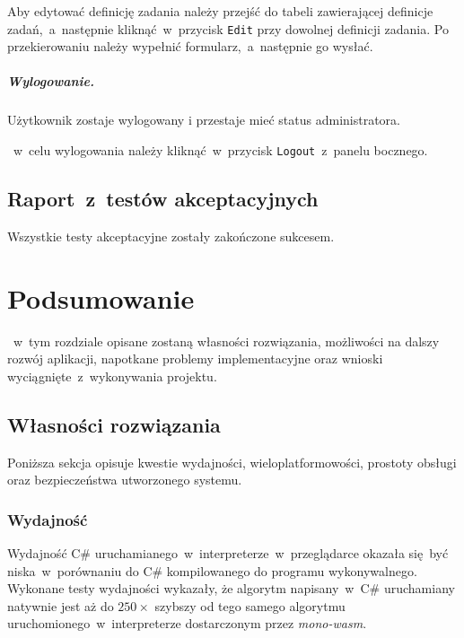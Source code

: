 \documentclass[a4paper,11pt,twoside]{report}
\theoremstyle{definition}
\begin{document}
                Aby edytować definicję zadania należy przejść do tabeli zawierającej definicje zadań,~a~następnie kliknąć~w~przycisk \texttt{Edit} przy dowolnej definicji zadania. Po przekierowaniu należy wypełnić formularz,~a~następnie go wysłać.

            \paragraph{Wylogowanie.}
                \noindent Użytkownik zostaje wylogowany i przestaje mieć status administratora.

               ~w~celu wylogowania należy kliknąć~w~przycisk \texttt{Logout}~z~panelu bocznego.


            \subsubsection{}    
            
    \section{Raport~z~testów akceptacyjnych}
    
        Wszystkie testy akceptacyjne zostały zakończone sukcesem.

\chapter{Podsumowanie}

   ~w~tym rozdziale opisane zostaną własności rozwiązania, możliwości na dalszy rozwój aplikacji,
    napotkane problemy implementacyjne oraz wnioski wyciągnięte~z~wykonywania projektu.

    \section{Własności rozwiązania}
        \label{wlasnosci-rozwiazania}
        Poniższa sekcja opisuje kwestie wydajności, wieloplatformowości, prostoty obsługi oraz bezpieczeństwa utworzonego systemu.
        
        \subsection{Wydajność}
            Wydajność C\# uruchamianego~w~interpreterze~w~przeglądarce okazała się być niska~w~porównaniu do C\# kompilowanego do programu wykonywalnego.
            Wykonane testy wydajności wykazały, że algorytm napisany~w~C\# uruchamiany natywnie jest aż do $250\times$ szybszy od tego samego algorytmu uruchomionego~w~interpreterze dostarczonym przez \textit{mono-wasm}.
            
\end{document}
